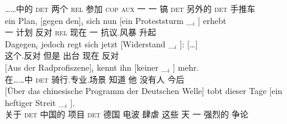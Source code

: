 \begin{sloppypar}
	 {}\spacebr{}……中的 \textsc{det} 两个 \textsc{rel} 参加 \textsc{cop} \textsc{aux} \spacebr{}一 {}    {}  一 镐   \textsc{det} 另外的 \textsc{det} 手推车\\
\ex 
\gll ein Plan, [gegen den]$_i$ sich nun [ein Proteststurm \_$_i$ ] erhebt\footnotemark\\
     一 计划 \spacebr{}反对 \textsc{rel}  现在 \spacebr{}一 抗议.风暴 {} {} 升起\\
\ex 
\gll {}Dagegen$_i$ jedoch regt sich jetzt [Widerstand \_$_i$ ]: [\ldots]\footnotemark\\
	{}这个.反对 但是 出台  现在 \spacebr{}反对 {}\\
\ex
\gll {}[Aus der Radprofiszene]$_i$ kennt ihn [keiner \_$_i$ ] mehr.\footnotemark\\
	 {}\spacebr{}在……中 \textsc{det} 骑行.专业.场景 知道 他 \spacebr{}没有人 {} {} 今后\\
\ex 
\gll {}[Über das chinesische Programm der Deutschen Welle] tobt dieser Tage [ein heftiger Streit \_$_i$ ].\footnotemark\\
     \spacebr{}关于 \textsc{det} 中国的 项目 \textsc{det} 德国 电波 肆虐 这些 天 \spacebr{}一 强烈的 争论\\
\zl
\end{sloppypar}

